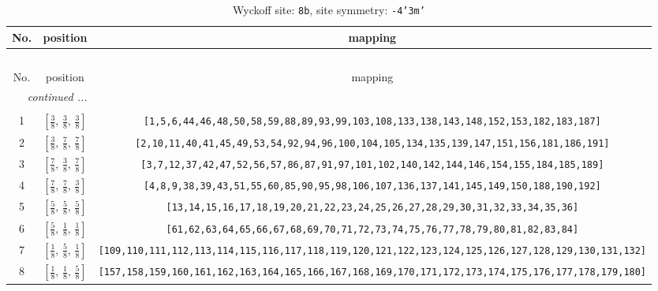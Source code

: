 \documentclass[fleqn,8pt]{jsarticle}
\begin{document}
\renewcommand{\arraystretch}{1.2}
\begin{longtable}{ccc}
\caption{Wyckoff site: {\tt 8b}, site symmetry: {\tt -4'3m'}}
 \\
 \hline \hline
No. & position & mapping \\ \hline \endfirsthead

\multicolumn{2}{l}{\tablename\ \thetable{}} \\
 \hline \hline
No. & position & mapping \\ \hline \endhead

 \hline \hline
\multicolumn{2}{r}{\footnotesize\it continued ...} \\ \endfoot

 \hline \hline
\multicolumn{2}{r}{} \\ \endlastfoot

1 & $\left[ \frac{3}{8},\, \frac{3}{8},\, \frac{3}{8} \right]$ & {\tt [1,5,6,44,46,48,50,58,59,88,89,93,99,103,108,133,138,143,148,152,153,182,183,187]} \\ \hline
2 & $\left[ \frac{3}{8},\, \frac{7}{8},\, \frac{7}{8} \right]$ & {\tt [2,10,11,40,41,45,49,53,54,92,94,96,100,104,105,134,135,139,147,151,156,181,186,191]} \\ \hline
3 & $\left[ \frac{7}{8},\, \frac{3}{8},\, \frac{7}{8} \right]$ & {\tt [3,7,12,37,42,47,52,56,57,86,87,91,97,101,102,140,142,144,146,154,155,184,185,189]} \\ \hline
4 & $\left[ \frac{7}{8},\, \frac{7}{8},\, \frac{3}{8} \right]$ & {\tt [4,8,9,38,39,43,51,55,60,85,90,95,98,106,107,136,137,141,145,149,150,188,190,192]} \\ \hline
5 & $\left[ \frac{5}{8},\, \frac{5}{8},\, \frac{5}{8} \right]$ & {\tt [13,14,15,16,17,18,19,20,21,22,23,24,25,26,27,28,29,30,31,32,33,34,35,36]} \\ \hline
6 & $\left[ \frac{5}{8},\, \frac{1}{8},\, \frac{1}{8} \right]$ & {\tt [61,62,63,64,65,66,67,68,69,70,71,72,73,74,75,76,77,78,79,80,81,82,83,84]} \\ \hline
7 & $\left[ \frac{1}{8},\, \frac{5}{8},\, \frac{1}{8} \right]$ & {\tt [109,110,111,112,113,114,115,116,117,118,119,120,121,122,123,124,125,126,127,128,129,130,131,132]} \\ \hline
8 & $\left[ \frac{1}{8},\, \frac{1}{8},\, \frac{5}{8} \right]$ & {\tt [157,158,159,160,161,162,163,164,165,166,167,168,169,170,171,172,173,174,175,176,177,178,179,180]} \\
\end{longtable}
\renewcommand{\arraystretch}{1.2}
\end{document}
